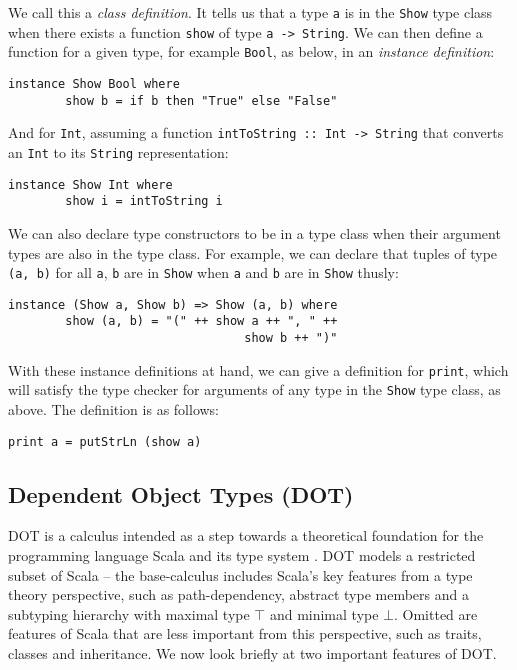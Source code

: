 \noindent We call this a \emph{class definition}. It tells us that a type
\texttt{a} is in the \texttt{Show} type class when there exists a function
\texttt{show} of type \texttt{a -> String}. We can then define a function for a
given type, for example \texttt{Bool}, as below, in an \emph{instance
definition}:
\begin{lstlisting}[mathescape]
    instance Show Bool where
        show b = if b then "True" else "False"
\end{lstlisting}

\noindent And for \texttt{Int}, assuming a function \texttt{intToString :: Int
-> String} that converts an \texttt{Int} to its \texttt{String} representation:
\begin{lstlisting}[mathescape]
    instance Show Int where
        show i = intToString i
\end{lstlisting}

\noindent We can also declare type constructors to be in a type class when their
argument types are also in the type class. For example, we can declare that
tuples of type \texttt{(a, b)} for all \texttt{a}, \texttt{b} are in
\texttt{Show} when \texttt{a} and \texttt{b} are in \texttt{Show} thusly:
\begin{lstlisting}[mathescape]
    instance (Show a, Show b) => Show (a, b) where
        show (a, b) = "(" ++ show a ++ ", " ++
                                 show b ++ ")"
\end{lstlisting}

\noindent With these instance definitions at hand, we can give a definition for
\texttt{print}, which will satisfy the type checker for arguments of any type in
the \texttt{Show} type class, as above. The definition is as follows:
\begin{lstlisting}[mathescape]
    print a = putStrLn (show a)
\end{lstlisting}

\subsection{Dependent Object Types (DOT)}
DOT is a calculus intended as a step towards a theoretical foundation for the
programming language Scala and its type system \cite{AMO12}. DOT models a
restricted subset of Scala -- the base-calculus includes Scala's key features
from a type theory perspective, such as path-dependency, abstract type members
and a subtyping hierarchy with maximal type $\top$ and minimal type $\bot$.
Omitted are features of Scala that are less important from this perspective,
such as traits, classes and inheritance. We now look briefly at two important
features of DOT.

